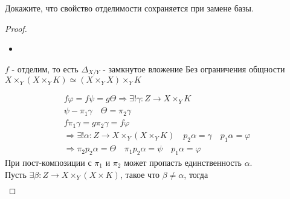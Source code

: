 \begin{prob}
Докажите, что свойство отделимости сохраняется при замене базы.
\end{prob}
\begin{proof}
\begin{itemize}
\item[]
\end{itemize}
$f$ - отделим, то есть $\Delta_{X\slash Y}$ - замкнутое вложение
Без ограничения общности $X \times_Y (X \times_Y K) \simeq (X \times_Y X) \times_Y K$
\begin{gather*}
    f \varphi = f \psi = g \Theta \Rightarrow \exists ! \gamma: Z \to X \times_Y K\\
    \psi - \pi_1 \gamma\quad \Theta = \pi_2 \gamma\\
    f \pi_1 \gamma = g \pi_2 \gamma = f \varphi\\
    \Rightarrow \exists! \alpha: Z \to X \times_Y (X \times_Y K)\quad p_2 \alpha = \gamma\quad p_1 \alpha = \varphi\\
    \Rightarrow \pi_2 p_2 \alpha = \Theta\quad \pi_1 p_2 \alpha = \psi\quad p_1 \alpha = \varphi
\end{gather*}
При пост-композиции с $\pi_1$ и $\pi_2$ может пропасть единственность $\alpha$.\\
Пусть $\exists \beta: Z \to X \times_Y (X \times K)$, такое что $\beta \ne \alpha$, тогда
\begin{gather*}

\end{gather*}
\end{proof}
